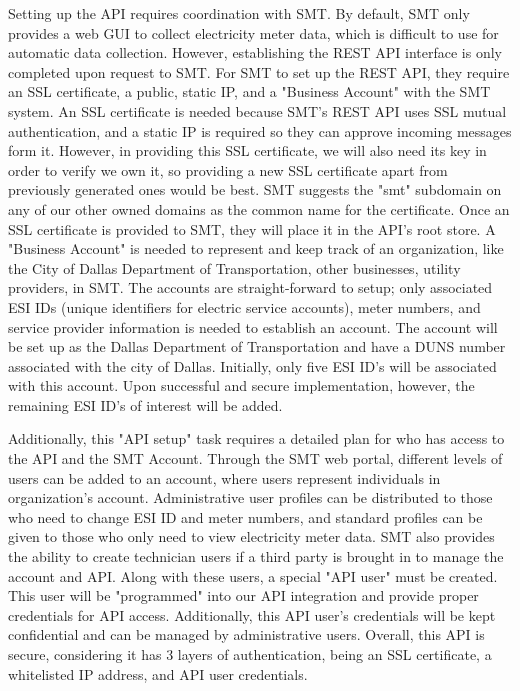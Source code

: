 \documentclass[letterpaper, notitlepage]{report}
\begin{document}
Setting up the API requires coordination with SMT. By default, SMT only provides a web GUI to collect electricity meter data, which is difficult to use for automatic data collection. However, establishing the REST API interface is only completed upon request to SMT. For SMT to set up the REST API, they require an SSL certificate, a public, static IP, and a "Business Account" with the SMT system. An SSL certificate is needed because SMT's REST API uses SSL mutual authentication, and a static IP is required so they can approve incoming messages form it. However, in providing this SSL certificate, we will also need its key in order to verify we own it, so providing a new SSL certificate apart from previously generated ones would be best. SMT suggests the "smt" subdomain on any of our other owned domains as the common name for the certificate. Once an SSL certificate is provided to SMT, they will place it in the API's root store. A "Business Account" is needed to represent and keep track of an organization, like the City of Dallas Department of Transportation, other businesses, utility providers, in SMT. The accounts are straight-forward to setup; only associated ESI IDs (unique identifiers for electric service accounts), meter numbers, and service provider information is needed to establish an account. The account will be set up as the Dallas Department of Transportation and have a DUNS number associated with the city of Dallas. Initially, only five ESI ID's will be associated with this account. Upon successful and secure implementation, however, the remaining ESI ID's of interest will be added.

Additionally, this "API setup" task requires a detailed plan for who has access to the API and the SMT Account. Through the SMT web portal, different levels of users can be added to an account, where users represent individuals in organization's account. Administrative user profiles can be distributed to those who need to change ESI ID and meter numbers, and standard profiles can be given to those who only need to view electricity meter data. SMT also provides the ability to create technician users if a third party is brought in to manage the account and API. Along with these users, a special "API user" must be created. This user will be "programmed" into our API integration and provide proper credentials for API access. Additionally, this API user's credentials will be kept confidential and can be managed by administrative users. Overall, this API is secure, considering it has 3 layers of authentication, being an SSL certificate, a whitelisted IP address, and API user credentials.
\end{document}
